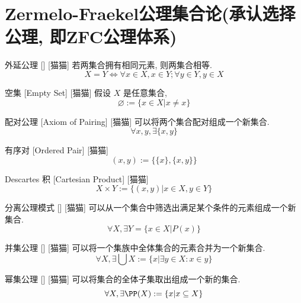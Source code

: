 \documentclass[UTF8]{ctexart}
\begin{document}
\section{Zermelo-Fraekel公理集合论(承认选择公理, 即ZFC公理体系)}

    \begin{axm}
        []
        {外延公理}
        []
        [猫猫]
        若两集合拥有相同元素, 则两集合相等. 
        \[X=Y\iff\forall x\in X, x\in Y; \forall y\in Y, y\in X\]
    \end{axm}
    
    \begin{dfn}
        []
        {空集}
        [Empty Set]
        [猫猫]
        假设 \(X\) 是任意集合, 
        \[\varnothing:=\{x\in X|x\neq x\}\]
    \end{dfn}
    
    \begin{axm}
        []
        {配对公理}
        [Axiom of Pairing]
        [猫猫]
        可以将两个集合配对组成一个新集合. 
        \[\forall x,y, \exists\{x,y\}\]
    \end{axm}
    
    \begin{dfn}
        []
        {有序对}
        [Ordered Pair]
        [猫猫]
        \[(x,y):=\{\{x\},\{x,y\}\}\]
    \end{dfn}
    
    \begin{dfn}
        []
        {Descartes 积}
        [Cartesian Product]
        [猫猫]
        \[X\times Y:=\{(x,y)|x\in X, y\in Y\}\]
    \end{dfn}
    
    \begin{axm}
        []
        {分离公理模式}
        []
        [猫猫]
        可以从一个集合中筛选出满足某个条件的元素组成一个新集合. 
        \[\forall X, \exists Y=\{x\in X|P(x)\}\]
    \end{axm}
    
    \begin{axm}
        []
        {并集公理}
        []
        [猫猫]
        可以将一个集族中全体集合的元素合并为一个新集合. 
        \[\forall X, \exists\bigcup X:=\{x|\exists y\in X: x\in y\}\]
    \end{axm}
    
    \begin{axm}
        []
        {幂集公理}
        []
        [猫猫]
        可以将集合的全体子集取出组成一个新的集合. 
        \[\forall X, \exists\PP(X):=\{x|x\subseteq X\}\]
    \end{axm}
    
\end{document}
